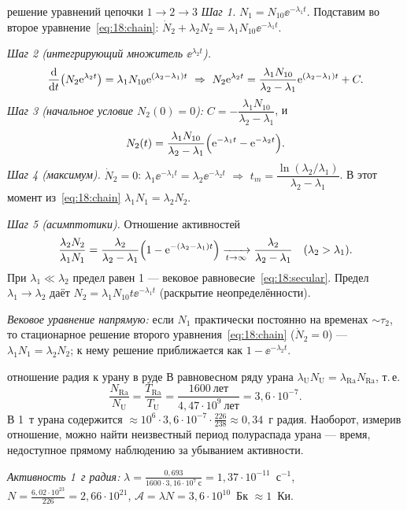 \begin{derivation}[label=der:18:chain]{решение уравнений цепочки $1\to2\to3$}
\emph{Шаг 1.} $N_1=N_{10}\ee^{-\lambda_1t}$. Подставим во второе уравнение~\eqref{eq:18:chain}:
$\dot N_2+\lambda_2N_2=\lambda_1N_{10}\ee^{-\lambda_1t}$.

\emph{Шаг 2 (интегрирующий множитель $\ee^{\lambda_2t}$).}
\[
  \frac{\mathrm{d} }{\mathrm{d} t}\bigl(N_2\mathrm{e}^{\lambda_2t}\bigr)=\lambda_1N_{10}\mathrm{e}^{(\lambda_2-\lambda_1)t}
  \ \Rightarrow\
  N_2\mathrm{e}^{\lambda_2t}=\frac{\lambda_1N_{10}}{\lambda_2-\lambda_1}\mathrm{e}^{(\lambda_2-\lambda_1)t}+C .
\]
\emph{Шаг 3 (начальное условие $N_2(0)=0$):} $C=-\dfrac{\lambda_1N_{10}}{\lambda_2-\lambda_1}$, и
\[
  N_2(t)=\frac{\lambda_1N_{10}}{\lambda_2-\lambda_1}\Bigl(\mathrm{e}^{-\lambda_1t}-\mathrm{e}^{-\lambda_2t}\Bigr).
\]
\emph{Шаг 4 (максимум).} $\dot N_2=0$: $\lambda_1\ee^{-\lambda_1t}=\lambda_2\ee^{-\lambda_2t}$ $\Rightarrow$ $t_m=\dfrac{\ln(\lambda_2/\lambda_1)}{\lambda_2-\lambda_1}$.
В этот момент из~\eqref{eq:18:chain} $\lambda_1N_1=\lambda_2N_2$.

\emph{Шаг 5 (асимптотики).} Отношение активностей
\[
  \frac{\lambda_2N_2}{\lambda_1N_1}=\frac{\lambda_2}{\lambda_2-\lambda_1}\Bigl(1-\mathrm{e}^{-(\lambda_2-\lambda_1)t}\Bigr)
  \xrightarrow[t\to\infty]{}\frac{\lambda_2}{\lambda_2-\lambda_1}\quad(\lambda_2>\lambda_1).
\]
При $\lambda_1\ll\lambda_2$ предел равен 1 — вековое равновесие~\eqref{eq:18:secular}. Предел $\lambda_1\to\lambda_2$ даёт
$N_2=\lambda_1N_{10}t\ee^{-\lambda_1t}$ (раскрытие неопределённости).

\emph{Вековое уравнение напрямую:} если $N_1$ практически постоянно на временах $\sim\tau_2$, то стационарное решение
второго уравнения~\eqref{eq:18:chain} ($\dot N_2=0$) — $\lambda_1N_1=\lambda_2N_2$; к нему решение приближается как $1-\ee^{-\lambda_2t}$.
\end{derivation}

\begin{derivation}[label=der:18:RaU]{отношение радия к урану в руде}
В равновесном ряду урана $\lambda_{\mathrm U}N_{\mathrm U}=\lambda_{\mathrm{Ra}}N_{\mathrm{Ra}}$, т.\,е.
\[
  \frac{N_{\mathrm{Ra}}}{N_{\mathrm U}}=\frac{T_{\mathrm{Ra}}}{T_{\mathrm U}}=\frac{1600\ \text{лет}}{4{,}47\cdot10^9\ \text{лет}}=3{,}6\cdot10^{-7}.
\]
В 1~т урана содержится $\approx10^6\cdot3{,}6\cdot10^{-7}\cdot\frac{226}{238}\approx0{,}34$~г радия. Наоборот, измерив отношение, можно найти неизвестный
период полураспада урана — время, недоступное прямому наблюдению за убыванием активности.

\emph{Активность 1~г радия:} $\lambda=\frac{0{,}693}{1600\cdot3{,}16\cdot10^7\ \text{с}}=1{,}37\cdot10^{-11}$~с$^{-1}$,
$N=\frac{6{,}02\cdot10^{23}}{226}=2{,}66\cdot10^{21}$, $\mathcal A=\lambda N=3{,}6\cdot10^{10}$~Бк $\approx1$~Ки.
\end{derivation}

